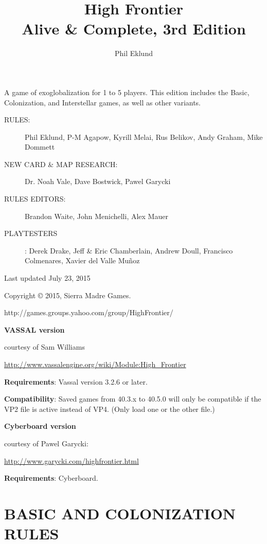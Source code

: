 \documentclass[a4paper]{book}
\title{High Frontier \\ Alive \& Complete, 3rd Edition}
\author{Phil Eklund}
\begin{document}
\maketitle

\newpage
A game of exoglobalization for 1 to 5 players. This edition includes the Basic, Colonization, and Interstellar games, as well as other variants.

\begin{description}
\item[RULES:] Phil Eklund, P-M Agapow, Kyrill Melai, Rus Belikov, Andy Graham, Mike Dommett
\item[NEW CARD \& MAP RESEARCH:] Dr. Noah Vale, Dave Bostwick, Pawel Garycki
\item[RULES EDITORS:] Brandon Waite, John Menichelli, Alex Mauer
\item[PLAYTESTERS]: Derek Drake, Jeff \& Eric Chamberlain, Andrew Doull, Francisco Colmenares, Xavier del Valle Muñoz

\end{description}

Last updated July 23, 2015

Copyright © 2015, Sierra Madre Games.

http://games.groups.yahoo.com/group/HighFrontier/


\large{\textbf{VASSAL version}} 

courtesy of Sam Williams

\url{http://www.vassalengine.org/wiki/Module:High_Frontier}

\textbf{Requirements}: Vassal version 3.2.6 or later. 

\textbf{Compatibility}: Saved games from 40.3.x to 40.5.0 will only be compatible if the VP2 file is active instead of VP4. (Only load one or the other file.)

\large{\textbf{Cyberboard version}}

courtesy of Pawel Garycki: 

\url{http://www.garycki.com/highfrontier.html}

\textbf{Requirements}: Cyberboard.

\tableofcontents

\part{BASIC AND COLONIZATION RULES}
\end{document}
